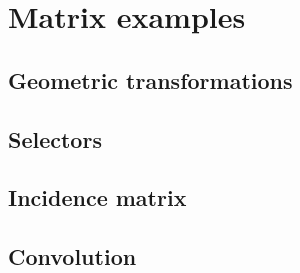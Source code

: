 \section{Matrix examples}
\subsection{Geometric transformations}
\subsection{Selectors}
\subsection{Incidence matrix}
\subsection{Convolution}
